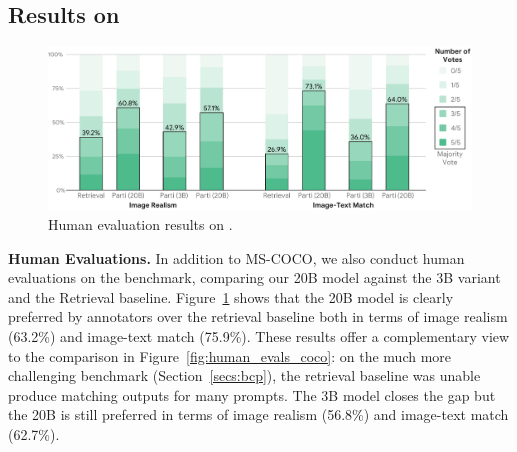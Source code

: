 \subsection{Results on \bcp}
\label{secs:evaluations_bcp}

\begin{figure}[tbh!]
    \centering
    \includegraphics[width=1.0\textwidth]{figures/human_evals_bcp.pdf}
    \caption{Human evaluation results on \bcp.}
    \label{fig:human_evals_bcp}
\end{figure}

\textbf{Human Evaluations.} 
In addition to MS-COCO, we also conduct human evaluations on the \bcpa{} benchmark, comparing our 20B model against the 3B variant and the Retrieval baseline. Figure~\ref{fig:human_evals_bcp} shows that the 20B model is clearly preferred by annotators over the retrieval baseline both in terms of image realism (63.2\%) and image-text match (75.9\%). These results offer a complementary view to the comparison in Figure~\ref{fig:human_evals_coco}: on the much more challenging \bcpa{} benchmark (Section~\ref{secs:bcp}), the retrieval baseline was unable produce matching outputs for many prompts. The 3B model closes the gap but the 20B is still preferred in terms of image realism (56.8\%) and image-text match (62.7\%).


